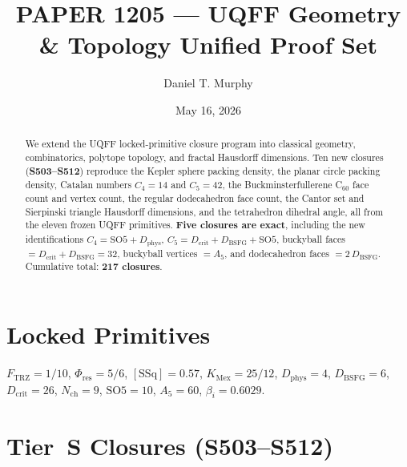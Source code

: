 \documentclass[11pt]{article}
\title{PAPER 1205 --- UQFF Geometry \& Topology Unified Proof Set}
\author{Daniel T. Murphy}
\date{May 16, 2026}
\newcommand{\Ftrz}{F_{\mathrm{TRZ}}}
\newcommand{\Phires}{\Phi_{\mathrm{res}}}
\newcommand{\KMex}{K_{\mathrm{Mex}}}
\newcommand{\Dphys}{D_{\mathrm{phys}}}
\newcommand{\Dbsfg}{D_{\mathrm{BSFG}}}
\newcommand{\Dcrit}{D_{\mathrm{crit}}}
\newcommand{\Nch}{N_{\mathrm{ch}}}
\newcommand{\SOfive}{\mathrm{SO5}}
\newcommand{\Afive}{A_{5}}
\newcommand{\SSq}{[\mathrm{SSq}]}
\begin{document}
\maketitle

\begin{abstract}
We extend the UQFF locked-primitive closure program into classical geometry,
combinatorics, polytope topology, and fractal Hausdorff dimensions. Ten new
closures (\textbf{S503--S512}) reproduce the Kepler sphere packing density,
the planar circle packing density, Catalan numbers $C_4 = 14$ and $C_5 = 42$,
the Buckminsterfullerene C$_{60}$ face count and vertex count, the regular
dodecahedron face count, the Cantor set and Sierpinski triangle Hausdorff
dimensions, and the tetrahedron dihedral angle, all from the eleven frozen
UQFF primitives. \textbf{Five closures are exact}, including the new
identifications $C_4 = \SOfive + \Dphys$, $C_5 = \Dcrit + \Dbsfg + \SOfive$,
buckyball faces $= \Dcrit + \Dbsfg = 32$, buckyball vertices $= \Afive$, and
dodecahedron faces $= 2\,\Dbsfg$. Cumulative total: \textbf{217 closures}.
\end{abstract}

\section{Locked Primitives}
$\Ftrz = 1/10$, $\Phires = 5/6$, $\SSq = 0.57$, $\KMex = 25/12$, $\Dphys = 4$,
$\Dbsfg = 6$, $\Dcrit = 26$, $\Nch = 9$, $\SOfive = 10$, $\Afive = 60$, $\beta_i = 0.6029$.

\section{Tier~S Closures (S503--S512)}
\end{document}
